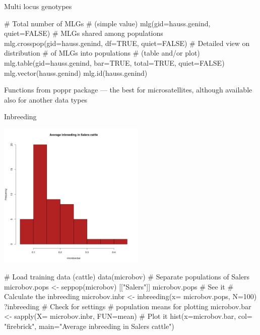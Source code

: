 \documentclass[compress, ucs, xelatex, 11pt, xcolor=svgnames, aspectratio=169,
	hyperref={
		bookmarks=true,
		unicode=true,
		colorlinks=true,
		pdftitle={Molecular data in R},
		plainpages=false,
		pdfauthor={Vojtech Zeisek},
		pdfsubject={Course about phylogeny and evolution in R},
		pdfcreator={XeLaTeX},
		pdfkeywords={R, evolution, phylogeny, molecular data},
		linkcolor=Crimson, %
		anchorcolor=Magenta, %
		citecolor=Magenta, %
		filecolor=Magenta, %
		menucolor=Magenta, %
		urlcolor=DodgerBlue, %
		pdftex},
	url={hyphens, lowtilde} %
	]{beamer}
\renewcommand{\texttt}[1]{\colorbox{Beige}{{\ttfamily #1}}}
\begin{document}

\begin{frame}[fragile]{Multi locus genotypes}
	\begin{multicols}{2}
		\texttt{[image: mlg.png]}
		\begin{spluscode}
    # Total number of MLGs
    # (simple value)
    mlg(gid=hauss.genind, quiet=FALSE)
    # MLGs shared among populations
    mlg.crosspop(gid=hauss.genind,
      df=TRUE, quiet=FALSE)
    # Detailed view on distribution
    # of MLGs into populations
    # (table and/or plot)
    mlg.table(gid=hauss.genind,
      bar=TRUE, total=TRUE,
      quiet=FALSE)
    mlg.vector(hauss.genind)
    mlg.id(hauss.genind)
		\end{spluscode}
	\end{multicols}
	Functions from poppr package --- the best for microsatellites, although available also for another data types
\end{frame}

\begin{frame}[fragile]{Inbreeding}
	\begin{multicols}{2}
		\includegraphics[height=7cm]{inbreeding.png}
		\begin{spluscode}
    # Load training data (cattle)
    data(microbov)
    # Separate populations of Salers
    microbov.pops <- seppop(microbov)
      [["Salers"]]
    microbov.pops # See it
    # Calculate the inbreeding
    microbov.inbr <- inbreeding(x=
      microbov.pops, N=100)
    ?inbreeding # Check for settings
    # population means for plotting
    microbov.bar <- sapply(X=
      microbov.inbr, FUN=mean)
    # Plot it
    hist(x=microbov.bar, col=
      "firebrick", main="Average
      inbreeding in Salers cattle")
		\end{spluscode}
	\end{multicols}
\end{frame}
\end{document}
